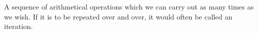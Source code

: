 A sequence of arithmetical operations which we can carry out as many times
as we wish. If it is to be repeated over and over, it would often be called an
iteration.
